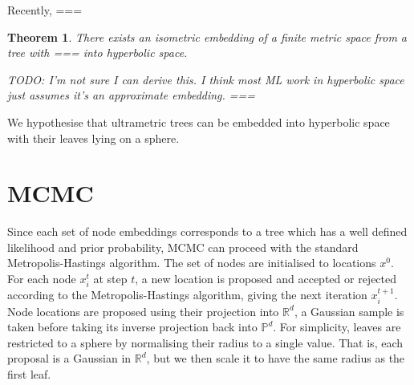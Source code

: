 \documentclass[11pt, twocolumn]{article}
\newtheorem{theorem}{Theorem}
\begin{document}
Recently, \cite{chami2020trees} ===

\begin{theorem} \label{thm:accessible}
    There exists an isometric embedding of a finite metric space from a tree with === into hyperbolic space.
    
    TODO: I'm not sure I can derive this. I think most ML work in hyperbolic space just assumes it's an approximate embedding. ===
    \end{theorem}
    We hypothesise that ultrametric trees can be embedded into hyperbolic space with their leaves lying on a sphere.

\section{MCMC}
Since each set of node embeddings corresponds to a tree which has a well defined likelihood and prior probability, MCMC can proceed with the standard Metropolis-Hastings algorithm.
The set of nodes are initialised to locations $x^{0}$.
For each node $x_{i}^t$ at step $t$, a new location is proposed and accepted or rejected according to the Metropolis-Hastings algorithm, giving the next iteration $x_i^{t+1}$.
Node locations are proposed using their projection into $\mathbb{R}^d$, a Gaussian sample is taken before taking its inverse projection back into $\mathbb{P}^d$.
For simplicity, leaves are restricted to a sphere by normalising their radius to a single value.
That is, each proposal is a Gaussian in $\mathbb{R}^d$, but we then scale it to have the same radius as the first leaf.

\end{document}
